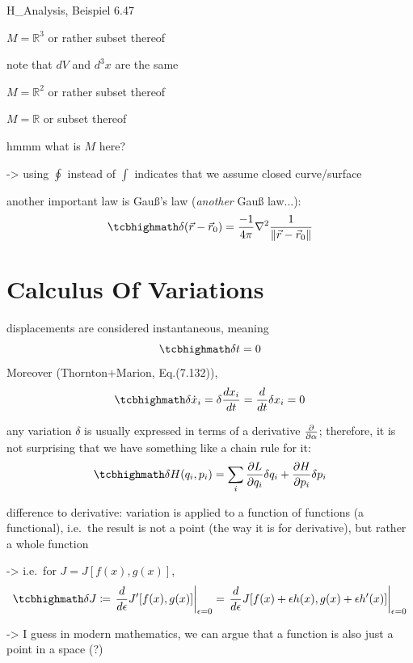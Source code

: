 \documentclass[../class_mech_main.tex]{subfiles}
\begin{document}
H\_Analysis, Beispiel 6.47

\begin{ex}
    $M = \mathbb{R}^3$ or rather subset thereof

    note that $dV$ and $d^3x$ are the same
\end{ex}


\begin{ex}
    $M = \mathbb{R}^2$ or rather subset thereof
\end{ex}


\begin{ex}
    $M = \mathbb{R}$ or subset thereof
\end{ex}


\begin{ex}
    hmmm what is $M$ here?
\end{ex}


-> using $\oint$ instead of $\int$ indicates that we assume closed curve/surface




another important law is Gauß's law (\emph{another} Gauß law...):
\begin{equation}
    \eqbox{
        \delta(\vec{r} - \vec{r}_0) = \frac{-1}{4 \pi} \nabla^2 \frac{1}{\norm{\vec{r} - \vec{r}_0}}
    }
\end{equation}




    \section{Calculus Of Variations}

displacements are considered instantaneous, meaning
\begin{equation}
    \eqbox{
        \delta t = 0
    }
\end{equation}
Moreover (Thornton+Marion, Eq.(7.132)),
\begin{equation}
    \eqbox{
        \delta \dot{x}_i = \delta \dv{x_i}{t} = \dv{t} \delta x_i = 0
    }
\end{equation}


any variation $\delta$ is usually expressed in terms of a derivative $\pdv{\alpha}$; therefore, it is not surprising that we have something like a chain rule for it:
\begin{equation}
    \eqbox{
        \delta H(q_i, p_i) = \sum_i \pdv{L}{q_i} \delta q_i + \pdv{H}{p_i} \delta p_i
    }
\end{equation}



difference to derivative: variation is applied to a function of functions (a functional), i.e.~the result is not a point (the way it is for derivative), but rather a whole function

-> i.e.~for $J = J[f(x), g(x)]$,
\begin{equation}
    \eqbox{
        \delta J \coloneqq \eval{\dv{\epsilon} J'[f(x), g(x)]}_{\epsilon = 0} = \eval{\dv{\epsilon} J[f(x) + \epsilon h(x), g(x) + \epsilon h'(x)]}_{\epsilon = 0}
    }
\end{equation}

-> I guess in modern mathematics, we can argue that a function is also just a point in a space (?)
\end{document}
